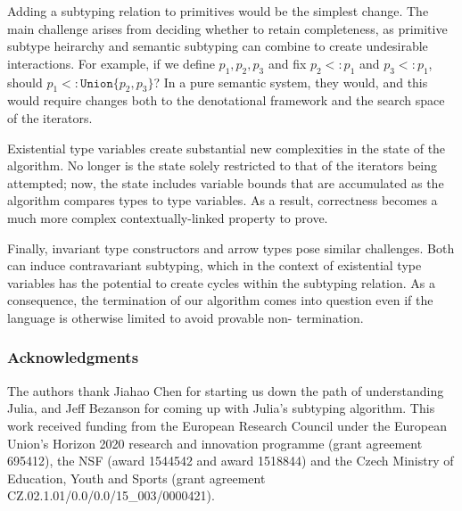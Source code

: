 \documentclass[a4paper,english]{lipics-v2019}
\newcommand{\xt}[1]{\texttt{#1}}
\newcommand{\union}[2]{\xt{Union\{}#1,#2\xt{\}}}
\begin{document}
Adding a subtyping relation to primitives would be the simplest change. The main
challenge arises from deciding whether to retain completeness, as primitive subtype
heirarchy and semantic subtyping can combine to create undesirable interactions.
For example, if we define $p_1,p_2,p_3$ and fix $p_2 <: p_1$ and $p_3 <: p_1$, 
should $p_1 <: \union{p_2}{p_3}$? In a pure semantic system, they would, and this
would require changes both to the denotational framework and the search space of the
iterators.

Existential type variables create substantial new complexities in the state of
the algorithm. No longer is the state solely restricted to that of the iterators 
being attempted; now, the state includes variable bounds that are accumulated as the
algorithm compares types to type variables. As a result, correctness becomes a much more
complex contextually-linked property to prove.

Finally, invariant type constructors and arrow types pose similar challenges.
Both can induce contravariant subtyping, which in the context of existential
type variables has the potential to create cycles within the subtyping
relation. As a consequence, the termination of our algorithm comes into
question even if the language is otherwise limited to avoid provable non-
termination.

\subsubsection*{Acknowledgments}
The authors thank Jiahao Chen for starting us down the path of understanding
Julia, and Jeff Bezanson for coming up with Julia's subtyping algorithm.  This
work received funding from the European Research Council under the European
Union's Horizon 2020 research and innovation programme (grant agreement
695412), the NSF (award 1544542 and award 1518844) and the Czech Ministry of
Education, Youth and Sports (grant agreement
CZ.02.1.01/0.0/0.0/15\_003/0000421).
 

%

\end{document}
